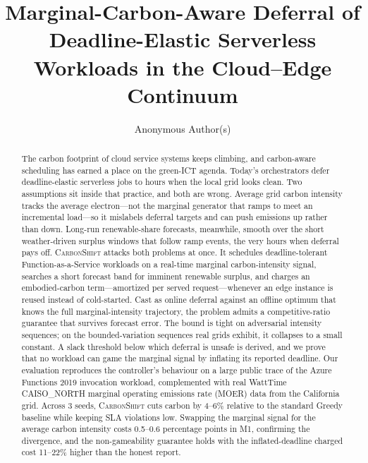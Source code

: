 \documentclass[runningheads]{llncs}
\begin{document}
\title{Marginal-Carbon-Aware Deferral of Deadline-Elastic Serverless
Workloads in the Cloud--Edge Continuum}


\author{Anonymous Author(s)}


\maketitle

\begin{abstract}
  The carbon footprint of cloud service systems keeps climbing, and carbon-aware scheduling has earned a place on the green-ICT agenda. Today's orchestrators defer deadline-elastic serverless jobs to hours when the local grid looks clean. Two assumptions sit inside that practice, and both are wrong. Average grid carbon intensity tracks the average electron---not the marginal generator that ramps to meet an incremental load---so it mislabels deferral targets and can push emissions up rather than down. Long-run renewable-share forecasts, meanwhile, smooth over the short weather-driven surplus windows that follow ramp events, the very hours when deferral pays off. \textsc{CarbonShift} attacks both problems at once. It schedules deadline-tolerant Function-as-a-Service workloads on a real-time marginal carbon-intensity signal, searches a short forecast band for imminent renewable surplus, and charges an embodied-carbon term---amortized per served request---whenever an edge instance is reused instead of cold-started. Cast as online deferral against an offline optimum that knows the full marginal-intensity trajectory, the problem admits a competitive-ratio guarantee that survives forecast error. The bound is tight on adversarial intensity sequences; on the bounded-variation sequences real grids exhibit, it collapses to a small constant. A slack threshold below which deferral is unsafe is derived, and we prove that no workload can game the marginal signal by inflating its reported deadline. Our evaluation reproduces the controller's behaviour on a large public trace of the Azure Functions 2019 invocation workload, complemented with real WattTime CAISO\_NORTH marginal operating emissions rate (MOER) data from the California grid. Across 3 seeds, \textsc{CarbonShift} cuts carbon by 4--6\% relative to the standard Greedy baseline while keeping SLA violations low. Swapping the marginal signal for the average carbon intensity costs 0.5--0.6 percentage points in M1, confirming the divergence, and the non-gameability guarantee holds with the inflated-deadline charged cost 11--22\% higher than the honest report.

\end{abstract}
\end{document}
